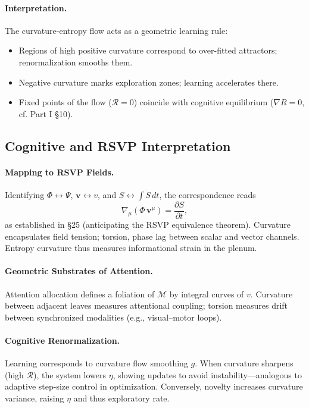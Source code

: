 \documentclass[12pt,a4paper,twoside,openright]{book}
\begin{document}
\paragraph{Interpretation.}
The curvature-entropy flow acts as a geometric learning rule:
\begin{itemize}
\item Regions of high positive curvature correspond to over-fitted attractors; 
  renormalization smooths them.
\item Negative curvature marks exploration zones; learning accelerates there.
\item Fixed points of the flow (\(\mathcal{R}=0\)) coincide with cognitive equilibrium 
  (\(\nabla R=0\), cf. Part I §10).
\end{itemize}

\subsection*{Cognitive and RSVP Interpretation}

\paragraph{Mapping to RSVP Fields.}
Identifying $\Phi\leftrightarrow\Psi$, $\mathbf{v}\leftrightarrow v$, and $S\leftrightarrow\int\dot S\,dt$,
the correspondence reads
\[
\nabla_\mu(\Phi\,\mathbf{v}^\mu)=\frac{\partial S}{\partial t},
\]
as established in §25 (anticipating the RSVP equivalence theorem).  
Curvature encapsulates field tension; torsion, phase lag between scalar and vector channels.  
Entropy curvature thus measures informational strain in the plenum.

\paragraph{Geometric Substrates of Attention.}
Attention allocation defines a foliation of $\mathcal{M}$ by integral curves of $v$.  
Curvature between adjacent leaves measures attentional coupling; 
torsion measures drift between synchronized modalities (e.g., visual–motor loops).

\paragraph{Cognitive Renormalization.}
Learning corresponds to curvature flow smoothing $g$.  
When curvature sharpens (high $\mathcal{R}$), the system lowers $\eta$, slowing updates to avoid instability—analogous to adaptive step-size control in optimization.  
Conversely, novelty increases curvature variance, raising $\eta$ and thus exploratory rate.
\end{document}
